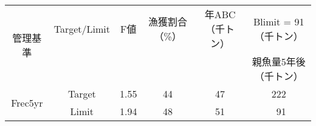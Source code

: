 \begin{center}\begin{tabular}{cccccc}\toprule\multirow{2}{*}{管理基準}	& {Target/Limit} 	& {F値} 	& {漁獲割合（\%）} 	& {\ThisYrAD 年ABC（千トン）} 	& Blimit = 91（千トン）\\ \cline{6-6}						& 					& 		& 					& 						& 親魚量5年後（千トン）\\\hline\multirow{2}{*}{Frec5yr}& Target 			& 1.55 	& 44 				& 47 					& 222				\\ \cline{2-6}						& Limit				& 1.94	& 48				& 51					& ~91				\\\bottomrule\end{tabular}\end{center}
